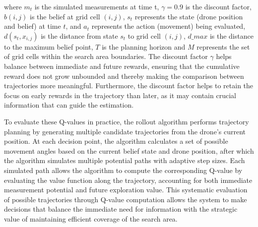 \documentclass[../report.tex]{subfiles}
\begin{document}
    where $ m_t $ is the simulated measurements at time t, $\gamma = 0.9$ is the discount factor, $b(i,j)$ is the belief at grid cell $(i,j)$, $s_t$ represents the state 
    (drone position and belief) at time $t$, and $a_t$ represents the action (movement) being evaluated, $d(s_t, x_{i,j})$ is the distance from state $s_t$ to grid cell $(i,j)$,
    $d\_max$ is the distance to the maximum belief point, $T$ is the planning horizon and $M$ represents the set of grid cells within the search area boundaries.
    The discount factor $\gamma$ helps balance between immediate and future rewards, ensuring that the cumulative reward does not grow unbounded and thereby making the 
    comparison between trajectories more meaningful. Furthermore, the discount factor helps to retain the focus on early rewards in the trajectory than later, as it may contain crucial 
    information that can guide the estimation. 

    To evaluate these Q-values in practice, the rollout algorithm performs trajectory planning by generating multiple candidate trajectories from the drone's current position. At each decision 
    point,  the algorithm calculates a set of possible movement angles based on the current belief state and drone position, after which the algorithm simulates multiple potential paths with 
    adaptive step sizes. Each simulated path allows the algorithm to compute the corresponding Q-value by evaluating the value function along the trajectory, accounting for both immediate 
    measurement potential and future exploration value. This systematic evaluation of possible trajectories through Q-value computation allows the system to make decisions that balance the 
    immediate need for information with the strategic value of maintaining efficient coverage of the search area.
\end{document}
